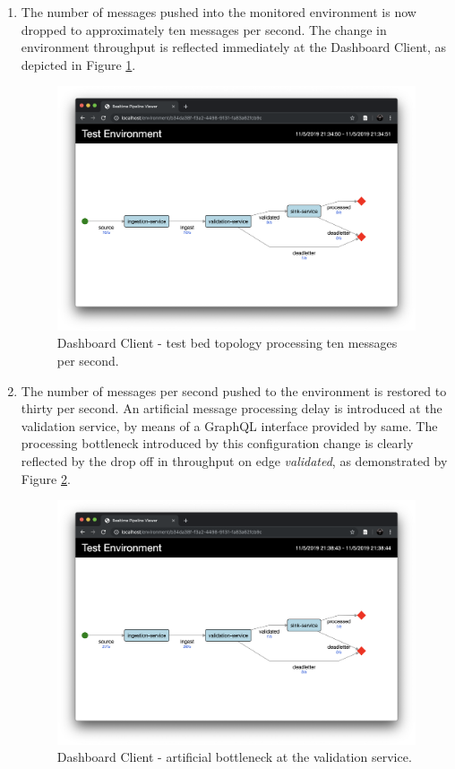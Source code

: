 \begin{enumerate}
\item The number of messages pushed into the monitored environment is now dropped to approximately ten messages per second. The change in environment throughput is reflected immediately at the Dashboard Client, as depicted in Figure \ref{walkthough_ten_messages_sec}.

\begin{figure}[H]
	\centering  
	\includegraphics[scale=0.3]{figures/walkthrough/topology_10_sec.png}
	\caption{Dashboard Client - test bed topology processing ten messages per second.}
	\label{walkthough_ten_messages_sec}
\end{figure}

\item The number of messages per second pushed to the environment is restored to thirty per second. An artificial message processing delay is introduced at the validation service, by means of a GraphQL interface provided by same.  The processing bottleneck introduced by this configuration change is clearly reflected by the drop off in throughput on edge \textit{validated}, as demonstrated by Figure \ref{walkthough_bottleneck}.

\begin{figure}[H]
	\centering  
	\includegraphics[scale=0.3]{figures/walkthrough/validation_bottleneck.png}
	\caption{Dashboard Client - artificial bottleneck at the validation service.}
	\label{walkthough_bottleneck}
\end{figure}

\end{enumerate}

